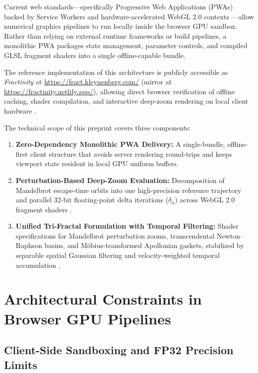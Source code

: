 \documentclass[11pt, a4paper]{article}
\begin{document}
Current web standards---specifically Progressive Web Applications (PWAs) backed by Service Workers \cite{berriman2015pwa} and hardware-accelerated WebGL 2.0 contexts \cite{khronoswebgl2, parisi2012webgl}---allow numerical graphics pipelines to run locally inside the browser GPU sandbox. Rather than relying on external runtime frameworks or build pipelines, a monolithic PWA packages state management, parameter controls, and compiled GLSL fragment shaders into a single offline-capable bundle.

The reference implementation of this architecture is publicly accessible as \emph{Fractinity} at \url{https://fract.kleynenberg.com/} (mirror at \url{https://fractinity.netlify.app/}), allowing direct browser verification of offline caching, shader compilation, and interactive deep-zoom rendering on local client hardware \cite{kleynenberg2026fractal}.

The technical scope of this preprint covers three components:
\begin{enumerate}[leftmargin=1.5em]
  \item \textbf{Zero-Dependency Monolithic PWA Delivery:} A single-bundle, offline-first client structure that avoids server rendering round-trips and keeps viewport state resident in local GPU uniform buffers.
  \item \textbf{Perturbation-Based Deep-Zoom Evaluation:} Decomposition of Mandelbrot escape-time orbits into one high-precision reference trajectory and parallel 32-bit floating-point delta iterations ($\delta_n$) across WebGL 2.0 fragment shaders \cite{martin2013superfractalthing, quilezfractal}.
  \item \textbf{Unified Tri-Fractal Formulation with Temporal Filtering:} Shader specifications for Mandelbrot perturbation zooms, transcendental Newton--Raphson basins, and M\"obius-transformed Apollonian gaskets, stabilized by separable spatial Gaussian filtering and velocity-weighted temporal accumulation \cite{karis2014taa, yang2020taa}.
\end{enumerate}

\section{Architectural Constraints in Browser GPU Pipelines}

\subsection{Client-Side Sandboxing and FP32 Precision Limits}
\end{document}
